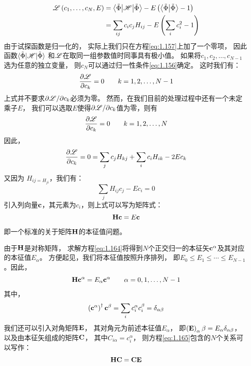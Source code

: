 \begin{equation}
 \begin{split}
     \mathscr{L}\left(c_1, \dots, c_N, E\right) &= \left\langle \tilde\Phi\middle\vert \mathscr{H} \middle\vert \tilde\Phi\right\rangle - E\left(\left\langle \tilde\Phi \middle\vert \tilde\Phi \right\rangle - 1\right) \\
     &= \sum_{ij} c_ic_jH_{ij} - E\left(\sum_i c_i^2 -1\right)
 \end{split}
 \label{eq:1.159}
\end{equation}
由于试探函数是归一化的，
实际上我们只在方程\eqref{eq:1.157}上加了一个零项，
因此函数$\langle \tilde\Phi\vert \mathscr{H} \vert \tilde\Phi\rangle$ 和$\mathscr{L}$在取同一组参数值时同事具有极小值。
如果将$c_1, c_2, \dots, c_{N-1}$选为任意的独立变量，
则$c_N$可以通过归一性条件\eqref{eq:1.156}确定。
这时我们有：
\begin{equation}
 \frac{\partial \mathscr{L}}{\partial c_k} = 0 \qquad k = 1, 2, \dots, N-1
 \label{eq:1.160}
\end{equation}
上式并不要求$\partial\mathscr{L}/\partial{c_k}$必须为零。
然而，在我们目前的处理过程中还有一个未定乘子$E$，
我们可以选取$E$使得$\partial\mathscr{L}/\partial{c_k}$值为零，则有
\begin{equation}
 \frac{\partial \mathscr{L}}{\partial c_k} = 0 \qquad k = 1, 2, \dots, N
 \label{eq:1.161}
\end{equation}
因此，
\begin{equation}
 \frac{\partial \mathscr{L}}{\partial c_k} = 0 = \sum_j c_j H_{kj} + \sum_i c_i H_{ik} - 2 Ec_k
 \label{eq:1.162}
\end{equation}
又因为 $H_{ij = H_{ji}}$，我们有：
\begin{equation}
 \sum_j H_{ij}c_j - Ec_i = 0
 \label{eq:1.163}
\end{equation}
引入列向量$\mathbf c$，其元素为$c_i$，则上式可以写为矩阵式：
\begin{equation}
 \mathbf{H}\mathbf{c} = E \mathbf{c}
 \label{eq:1.164}
\end{equation}
即一个标准的关于矩阵$\mathbf{H}$的本征值问题。

由于$\mathbf{H}$是对称矩阵，
求解方程\eqref{eq:1.164}将得到$N$个正交归一的本征矢$\mathbf{c}^\alpha$及其对应的本征值$E_\alpha$。
方便起见，我们将本征值按照升序排列，
即$E_0 \leq E_1 \leq \cdots \leq E_{N-1}$。因此，
\begin{equation}
 \mathbf{H}\mathbf{c}^\alpha = E_\alpha \mathbf{c}^\alpha\qquad \alpha = 0, 1, \dots, N-1
 \label{eq:1.165}
\end{equation}
其中，
\begin{equation}
 \left(\mathbf{c}^\alpha\right)^\dagger\mathbf{c}^\beta = \sum_i c_i^\alpha c_i^\beta = \delta_{\alpha\beta}
 \label{eq:1.166}
\end{equation}
我们还可以引入对角矩阵$\mathbf{E}$，
其对角元为前述本征值$E_\alpha$，
即$\left(\mathbf{E}\right)_\alpha\beta = E_\alpha\delta_{\alpha\beta}$，
以及由本征矢组成的矩阵$\mathbf{C}$，
其中$C_{i\alpha} = c_i^\alpha$，
则方程\eqref{eq:1.165}包含的$N$个关系可以写作：
\begin{equation}
 \mathbf{H}\mathbf{C} = \mathbf{C}\mathbf{E}
 \label{eq:1.167}
\end{equation}

